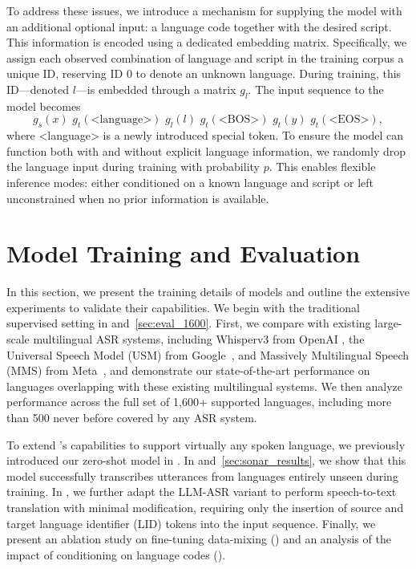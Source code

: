 \documentclass[]{fairmeta}
\begin{document}
To address these issues, we introduce a mechanism for supplying the model with an additional optional input: a language code together with the desired script. This information is encoded using a dedicated embedding matrix. Specifically, we assign each observed combination of language and script in the training corpus a unique ID, reserving ID 0 to denote an unknown language. During training, this ID—denoted $l$—is embedded through a matrix $g_l$. The input sequence to the model becomes
\[ g_s(x) \,\, g_t(\text{<language>}) \,\, g_l(l) \,\,g_t(\text{<BOS>}) \,\, g_t(y) \,\, g_t(\text{<EOS>}), \]
where <language> is a newly introduced special token. To ensure the model can function both with and without explicit language information, we randomly drop the language input during training with probability $p$. This enables flexible inference modes: either conditioned on a known language and script or left unconstrained when no prior information is available.

\section{Model Training and Evaluation}
\label{section:eval}

In this section, we present the training details of \OmniASR models and outline the extensive experiments to validate their capabilities. We begin with the traditional supervised setting in  and~\ref{sec:eval_1600}. First, we compare \OmniASR with existing large-scale multilingual ASR systems, including Whisperv3 from OpenAI \citep{radford2023robust}, the Universal Speech Model (USM) from Google~\citep{zhang2023google}, and Massively Multilingual Speech (MMS) from Meta~\citep{pratap2024scaling}, and demonstrate our state-of-the-art performance on languages overlapping with these existing multilingual systems. We then analyze performance across the full set of 1,600+ supported languages, including more than 500 never before covered by any ASR system.

To extend \OmniASR’s capabilities to support virtually any spoken language, we previously introduced our zero-shot model in . In  and~\ref{sec:sonar_results}, we show that this model successfully transcribes utterances from languages entirely unseen during training. In , we further adapt the LLM-ASR variant to perform speech-to-text translation with minimal modification, requiring only the insertion of source and target language identifier (LID) tokens into the input sequence. Finally, we present an ablation study on fine-tuning data-mixing () and an analysis of the impact of conditioning on language codes ().
\end{document}
